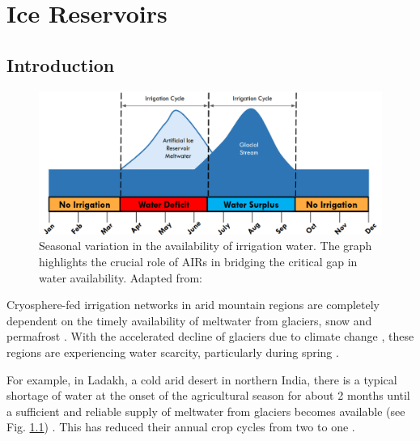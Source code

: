 \chapter{Ice Reservoirs}


\section{Introduction}

\begin{figure}[t]
\centering
\includegraphics[width=12cm]{figs/irrigation_cycles.png}

\caption{Seasonal variation in the availability of irrigation water. The graph highlights the crucial role of
AIRs in bridging the critical gap in water availability. Adapted from: \cite{nusserLocalKnowledgeGlobal2016}}

\label{fig:irrigation_cycles}
\end{figure}

Cryosphere-fed irrigation networks in arid mountain regions are completely dependent on the timely availability
of meltwater from glaciers, snow and permafrost \citep{immerzeelImportanceVulnerabilityWorld2020,
farhanHydrologicalRegimesConjunction2015, tveitenGlacierGrowingLocal2007}. With the accelerated decline of
glaciers due to climate change \citep{nusserLocalKnowledgeGlobal2016}, these regions are experiencing water
scarcity, particularly during spring \citep{norphelSnowWaterHarvesting2015,
mukhopadhyayReevaluationSnowmeltGlacial2015}.

For example, in Ladakh, a cold arid desert in northern India, there is a typical shortage of water at the onset
of the agricultural season for about 2 months until a sufficient and reliable supply of meltwater from glaciers
becomes available (see Fig. \ref{fig:irrigation_cycles}) \citep{norphelSnowWaterHarvesting2015,
nusserLocalKnowledgeGlobal2016, vincentEnergyClimateChange2009}. This has reduced their annual crop cycles from
two to one \citep{nusserSociohydrologyArtificialGlaciers2019}.

